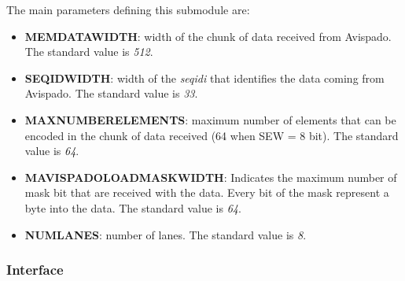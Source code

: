 The main parameters defining this submodule are:
\begin{itemize}
    \item \textbf{MEM\+DATA\+WIDTH}: width of the chunk of data received from Avispado. The standard value is \textit{512}.
    
    \item \textbf{SEQ\+ID\+WIDTH}: width of the \textit{seq\+id\+i} that identifies the data coming from Avispado. The standard value is \textit{33}.
    
    \item \textbf{MAX\+NUMBER\+ELEMENTS}: maximum number of elements that can be encoded in the chunk of data received (64 when SEW = 8 bit). The standard value is \textit{64}.
    
    \item \textbf{MAVISPADO\+LOAD\+MASK\+WIDTH}: Indicates the maximum number of mask bit that are received with the data. Every bit of the mask represent a byte into the data. The standard value is \textit{64}.
    
    \item \textbf{NUM\+LANES}: number of lanes. The standard value is \textit{8}.
\end{itemize}

\subsubsection{Interface}

